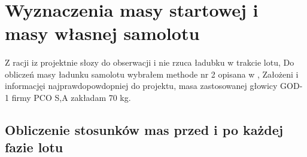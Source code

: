\clearpage
\section{Wyznaczenia masy startowej i masy własnej samolotu}
    
    \paragraph{}
        Z racji iz projektnie słozy  do obserwacji i nie rzuca ładubku w trakcie lotu,
        Do obliczeń masy ładunku samolotu wybrałem methode nr 2 opisana w \cite{galinski},
        Założeni i informacjęi najprawdopowdopniej do projektu, masa zastosowanej głowicy GOD-1 firmy PCO S,A zakładam 70 kg.
        
    \subsection{Obliczenie stosunków mas przed i po każdej fazie lotu}
